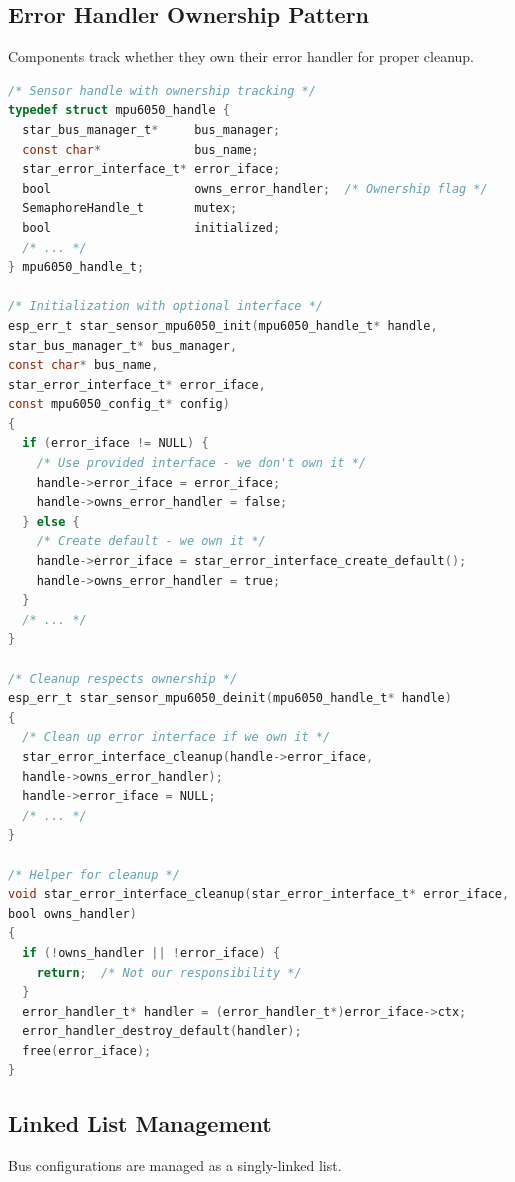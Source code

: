 \subsection{Error Handler Ownership Pattern}

Components track whether they own their error handler for proper cleanup.

\begin{lstlisting}[language=C]
/* Sensor handle with ownership tracking */
typedef struct mpu6050_handle {
  star_bus_manager_t*     bus_manager;
  const char*             bus_name;
  star_error_interface_t* error_iface;
  bool                    owns_error_handler;  /* Ownership flag */
  SemaphoreHandle_t       mutex;
  bool                    initialized;
  /* ... */
} mpu6050_handle_t;

/* Initialization with optional interface */
esp_err_t star_sensor_mpu6050_init(mpu6050_handle_t* handle,
star_bus_manager_t* bus_manager,
const char* bus_name,
star_error_interface_t* error_iface,
const mpu6050_config_t* config)
{
  if (error_iface != NULL) {
    /* Use provided interface - we don't own it */
    handle->error_iface = error_iface;
    handle->owns_error_handler = false;
  } else {
    /* Create default - we own it */
    handle->error_iface = star_error_interface_create_default();
    handle->owns_error_handler = true;
  }
  /* ... */
}

/* Cleanup respects ownership */
esp_err_t star_sensor_mpu6050_deinit(mpu6050_handle_t* handle)
{
  /* Clean up error interface if we own it */
  star_error_interface_cleanup(handle->error_iface,
  handle->owns_error_handler);
  handle->error_iface = NULL;
  /* ... */
}

/* Helper for cleanup */
void star_error_interface_cleanup(star_error_interface_t* error_iface,
bool owns_handler)
{
  if (!owns_handler || !error_iface) {
    return;  /* Not our responsibility */
  }
  error_handler_t* handler = (error_handler_t*)error_iface->ctx;
  error_handler_destroy_default(handler);
  free(error_iface);
}
\end{lstlisting}

\subsection{Linked List Management}

Bus configurations are managed as a singly-linked list.

